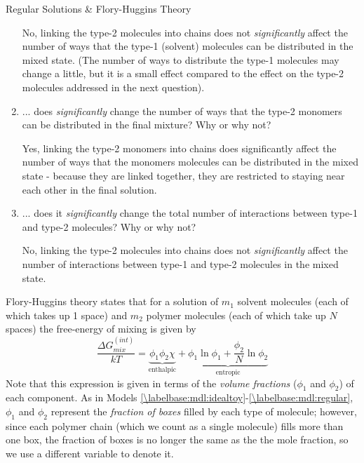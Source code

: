 \begin{activity}{Regular Solutions \& Flory-Huggins Theory}
\begin{ctqs}
\begin{enumerate}
				\begin{solution}[1in]
					No, linking the type-2 molecules into chains does not \emph{significantly} affect the number of ways that the type-1 (solvent) molecules can be distributed in the mixed state.  (The number of ways to distribute the type-1 molecules may change a little, but it is a small effect compared to the effect on the type-2 molecules addressed in the next question).
				\end{solution}
			
			\item ... does \emph{significantly} change the number of ways that the type-2 monomers can be distributed in the final mixture?  Why or why not?
				\label{\labelbase:ctq:FHtype2}
			
				\begin{solution}[0.9in]
					Yes, linking the type-2 monomers into chains does  significantly affect the number of ways that the monomers molecules can be distributed in the mixed state - because they are linked together, they are restricted to staying near each other in the final solution.
				\end{solution}
			
			\item ... does it \emph{significantly} change the total number of interactions between type-1 and type-2 molecules?  Why or why not?
				\label{\labelbase:ctq:FHinteraction}
			
				\begin{solution}[0.9in]
					No, linking the type-2 molecules into chains does not \emph{significantly} affect the number of interactions between type-1 and type-2 molecules in the mixed state.
				\end{solution}
				
		\end{enumerate}
	
\end{ctqs}

\begin{infobox}
	Flory-Huggins theory states that for a solution of $m_1$ solvent molecules (each of which takes up 1 space) and $m_2$ polymer molecules (each of which take up $N$ spaces) the free-energy of mixing is given by
	\begin{equation*}
		\frac{\Delta G_{mix}^{(int)}}{kT} = \underbrace{\phi_1 \phi_2 \chi}_{\text{enthalpic}} + \underbrace{\phi_1 \ln \phi_1 + \frac{\phi_2}{N} \ln \phi_2}_{\text{entropic}}
	\end{equation*}
	Note that this expression is given in terms of the \emph{volume fractions} ($\phi_1$ and $\phi_2$) of each component.  As in Models \ref{\labelbase:mdl:idealtoy}-\ref{\labelbase:mdl:regular}, $\phi_1$ and $\phi_2$ represent the \emph{fraction of boxes} filled by each type of molecule; however, since each polymer chain (which we count as a single molecule) fills more than one box, the fraction of boxes is no longer the same as the the mole fraction, so we use a different variable to denote it.
	

\end{infobox}
\end{activity}
